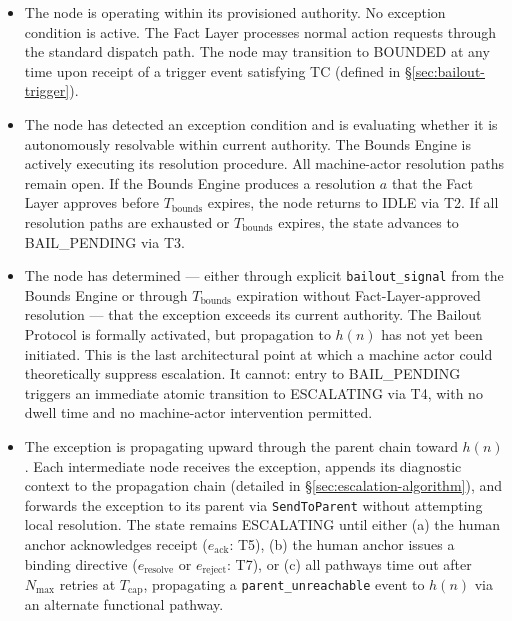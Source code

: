 \begin{itemize}\itemsep0em
\item[\textbf{IDLE.}] The node is operating within its provisioned authority. No exception condition is active. The Fact Layer processes normal action requests through the standard dispatch path. The node may transition to BOUNDED at any time upon receipt of a trigger event satisfying TC (defined in \S\ref{sec:bailout-trigger}).

\item[\textbf{BOUNDED.}] The node has detected an exception condition and is evaluating whether it is autonomously resolvable within current authority. The Bounds Engine is actively executing its resolution procedure. All machine-actor resolution paths remain open. If the Bounds Engine produces a resolution $a$ that the Fact Layer approves before $T_{\text{bounds}}$ expires, the node returns to IDLE via T2. If all resolution paths are exhausted or $T_{\text{bounds}}$ expires, the state advances to BAIL\_PENDING via T3.

\item[\textbf{BAIL\_PENDING.}] The node has determined — either through explicit \texttt{bailout\_signal} from the Bounds Engine or through $T_{\text{bounds}}$ expiration without Fact-Layer-approved resolution — that the exception exceeds its current authority. The Bailout Protocol is formally activated, but propagation to $h(n)$ has not yet been initiated. This is the last architectural point at which a machine actor could theoretically suppress escalation. It cannot: entry to BAIL\_PENDING triggers an immediate atomic transition to ESCALATING via T4, with no dwell time and no machine-actor intervention permitted.

\item[\textbf{ESCALATING.}] The exception is propagating upward through the parent chain toward $h(n)$. Each intermediate node receives the exception, appends its diagnostic context to the propagation chain (detailed in \S\ref{sec:escalation-algorithm}), and forwards the exception to its parent via \texttt{SendToParent} without attempting local resolution. The state remains ESCALATING until either (a) the human anchor acknowledges receipt ($e_{\text{ack}}$: T5), (b) the human anchor issues a binding directive ($e_{\text{resolve}}$ or $e_{\text{reject}}$: T7), or (c) all pathways time out after $N_{\max}$ retries at $T_{\text{cap}}$, propagating a \texttt{parent\_unreachable} event to $h(n)$ via an alternate functional pathway.


\end{itemize}
